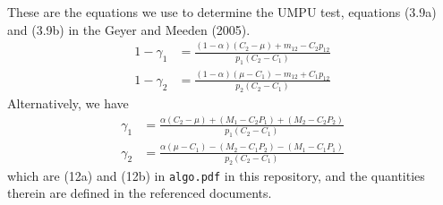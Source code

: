 \documentclass[11pt]{article}
\let\code=\texttt
\begin{document}
These are the equations we use to determine the UMPU test,
equations (3.9a) and (3.9b) in the Geyer and Meeden (2005).
\begin{equation} \label{eq:one-minus-gamma}
\begin{split}
   1 - \gamma_1
   & =
   \frac{(1 - \alpha) (C_2 - \mu) + m_{1 2} - C_2 p_{1 2}}
   {p_1 (C_2 - C_1)}
   \\
   1 - \gamma_2
   & =
   \frac{(1 - \alpha) (\mu - C_1) - m_{1 2} + C_1 p_{1 2}}
   {p_2 (C_2 - C_1)}
\end{split}
\end{equation}
Alternatively, we have
\begin{equation} \label{eq:gamma}
\begin{split}
   \gamma_1
   & =
   \frac{\alpha (C_2 - \mu) + (M_1 - C_2 P_1) + (M_2 - C_2 P_2)}
   {p_1 (C_2 - C_1)}
   \\
   \gamma_2
   & =
   \frac{\alpha (\mu - C_1) - (M_2 - C_1 P_2) - (M_1 - C_1 P_1)}
   {p_2 (C_2 - C_1)}
\end{split}
\end{equation}
which are (12a) and (12b) in \code{algo.pdf} in this repository,
and the quantities therein are defined in the referenced documents.
%
%
%
\end{document}
